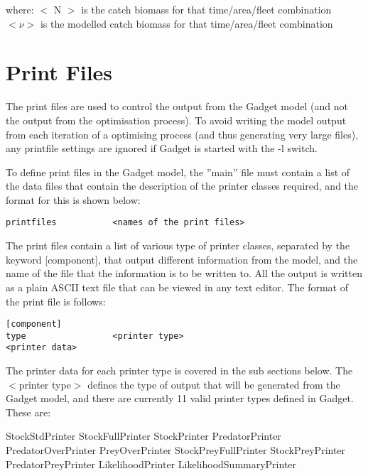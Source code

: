 \documentclass[10pt,twoside]{book}
\begin{document}
where:\newline
$<$ N $>$ is the catch biomass for that time/area/fleet combination\newline
$<\nu>$ is the modelled catch biomass for that time/area/fleet combination

\chapter{Print Files}\label{chap:print}
The print files are used to control the output from the Gadget model (and not the output from the optimisation process).  To avoid writing the model output from each iteration of a optimising process (and thus generating very large files), any printfile settings are ignored if Gadget is started with the -l switch.

\bigskip
To define print files in the Gadget model, the ''main'' file must contain a list of the data files that contain the description of the printer classes required, and the format for this is shown below:

{\small\begin{verbatim}
printfiles           <names of the print files>
\end{verbatim}}

The print files contain a list of various type of printer classes, separated by the keyword [component], that output different information from the model, and the name of the file that the information is to be written to.  All the output is written as a plain ASCII text file that can be viewed in any text editor.  The format of the print file is follows:

{\small\begin{verbatim}
[component]
type                 <printer type>
<printer data>
\end{verbatim}}

The printer data for each printer type is covered in the sub sections below.  The $<$printer type$>$ defines the type of output that will be generated from the Gadget model, and there are currently 11 valid printer types defined in Gadget.  These are:

\bigskip
StockStdPrinter\newline
StockFullPrinter\newline
StockPrinter\newline
PredatorPrinter\newline
PredatorOverPrinter\newline
PreyOverPrinter\newline
StockPreyFullPrinter\newline
StockPreyPrinter\newline
PredatorPreyPrinter\newline
LikelihoodPrinter\newline
LikelihoodSummaryPrinter
\end{document}
